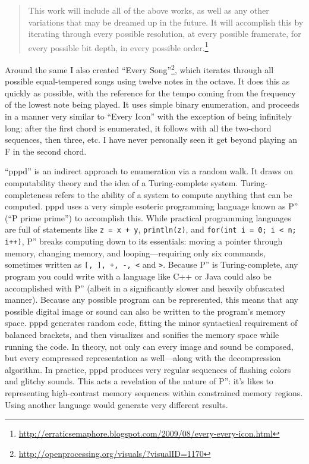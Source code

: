 \documentclass{thesis}
\begin{document}
	\begin{quote}
	This work will include all of the above works, as well as any other variations that may be dreamed up in the future. It will accomplish this by iterating through every possible resolution, at every possible framerate, for every possible bit depth, in every possible order.\footnote{\url{http://erraticsemaphore.blogspot.com/2009/08/every-every-icon.html}}
	\end{quote}
	
	Around the same I also created ``Every Song''\footnote{\url{http://openprocessing.org/visuals/?visualID=1170}}, which iterates through all possible equal-tempered songs using twelve notes in the octave. It does this as quickly as possible, with the reference for the tempo coming from the frequency of the lowest note being played. It uses simple binary enumeration, and proceeds in a manner very similar to ``Every Icon'' with the exception of being infinitely long: after the first chord is enumerated, it follows with all the two-chord sequences, then three, etc. I have never personally seen it get beyond playing an F in the second chord.

	``pppd''\cite{kyle_mcdonald_pppd_2009} is an indirect approach to enumeration via a random walk. It draws on computability theory\cite{boolos_computability_2002} and the idea of a Turing-complete system. Turing-completeness refers to the ability of a system to compute anything that can be computed. pppd uses a very simple esoteric programming language known as P'' (``P prime prime'') to accomplish this. While practical programming languages are full of statements like \verb!z = x + y!, \verb!println(z)!, and \verb!for(int i = 0; i < n; i++)!, P'' breaks computing down to its essentials: moving a pointer through memory, changing memory, and looping---requiring only six commands, sometimes written as \verb![, ], +, -, <! and \verb!>!. Because P'' is Turing-complete, any program you could write with a language like C++ or Java could also be accomplished with P'' (albeit in a significantly slower and heavily obfuscated manner). Because any possible program can be represented, this means that any possible digital image or sound can also be written to the program's memory space. pppd generates random code, fitting the minor syntactical requirement of balanced brackets, and then visualizes and sonifies the memory space while running the code. In theory, not only can every image and sound be composed, but every compressed representation as well---along with the decompression algorithm. In practice, pppd produces very regular sequences of flashing colors and glitchy sounds. This acts a revelation of the nature of P'': it's likes to representing high-contrast memory sequences within constrained memory regions. Using another language would generate very different results.
	
\end{document}
